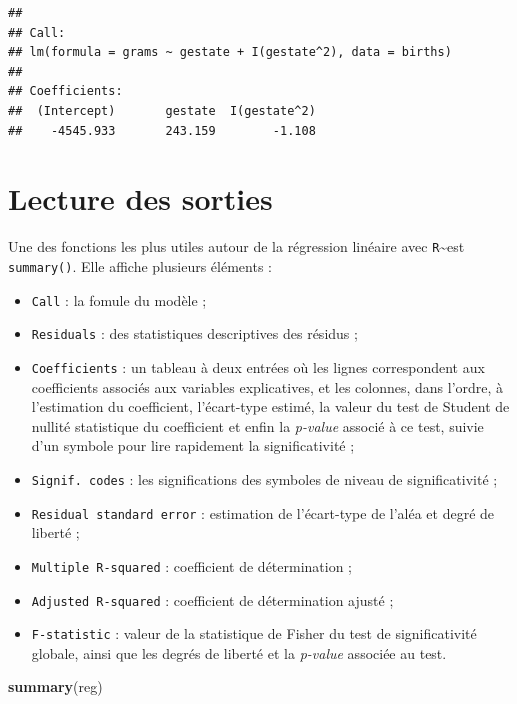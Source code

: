 \documentclass[
  11pt,
]{book}
\newenvironment{Shaded}{\begin{snugshade}}{\end{snugshade}}
\newcommand{\KeywordTok}[1]{\textcolor[rgb]{0.13,0.29,0.53}{\textbf{#1}}}
\newcommand{\NormalTok}[1]{#1}
\providecommand{\tightlist}{%
  \setlength{\itemsep}{0pt}\setlength{\parskip}{0pt}}
\numberwithin{equation}{section}
\numberwithin{countremarque}{section}
\begin{document}
\begin{lstlisting}
## 
## Call:
## lm(formula = grams ~ gestate + I(gestate^2), data = births)
## 
## Coefficients:
##  (Intercept)       gestate  I(gestate^2)  
##    -4545.933       243.159        -1.108
\end{lstlisting}

\hypertarget{regressions_lecture}{%
\section{Lecture des sorties}\label{regressions_lecture}}

Une des fonctions les plus utiles autour de la régression linéaire avec \texttt{R}\textasciitilde est \texttt{summary()}. Elle affiche plusieurs éléments :

\begin{itemize}
\tightlist
\item
  \texttt{Call} : la fomule du modèle ;
\item
  \texttt{Residuals} : des statistiques descriptives des résidus ;
\item
  \texttt{Coefficients} : un tableau à deux entrées où les lignes correspondent aux coefficients associés aux variables explicatives, et les colonnes, dans l'ordre, à l'estimation du coefficient, l'écart-type estimé, la valeur du test de Student de nullité statistique du coefficient et enfin la \emph{p-value} associé à ce test, suivie d'un symbole pour lire rapidement la significativité ;
\item
  \texttt{Signif.\ codes} : les significations des symboles de niveau de significativité ;
\item
  \texttt{Residual\ standard\ error} : estimation de l'écart-type de l'aléa et degré de liberté ;
\item
  \texttt{Multiple\ R-squared} : coefficient de détermination ;
\item
  \texttt{Adjusted\ R-squared} : coefficient de détermination ajusté ;
\item
  \texttt{F-statistic} : valeur de la statistique de Fisher du test de significativité globale, ainsi que les degrés de liberté et la \emph{p-value} associée au test.
\end{itemize}

\begin{Shaded}
\begin{Highlighting}[]
\KeywordTok{summary}\NormalTok{(reg)}
\end{Highlighting}
\end{Shaded}
\end{document}
